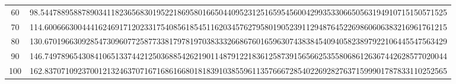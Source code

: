 \documentclass[final]{article}
\begin{document}
\begin{table}
\begin{tabular}{|c|c|}
		60  & 98.54478895887890341182365683019522186958016650440952312516595456004299353306650563194910715150571525  \\
		70  & 114.6006663004441624691712023317540856185451162034576279580190523911294876452269860606383216961761215  \\
		80  & 130.6701966309285473096077258773381797819703833326686760165963074383845409405823897922106445547563429  \\
		90  & 146.7497896543084106513374421250368854262190114879122183612587391565662535580686126367442628577020044  \\
		100 & 162.8370710923700121324637071671686166801818391038559611357666728540226928276371599901787833110252565  \\
		\hline
		\hline
	\end{tabular}
	\bigskip\bigskip
\end{table}
\end{document}
